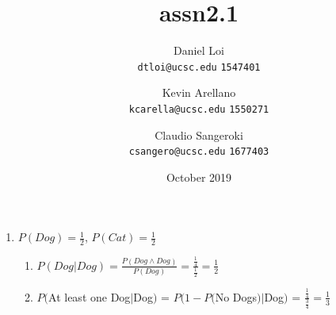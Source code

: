 \documentclass[12pt]{article}
\title{assn2.1}
\author{
  Daniel Loi\\
  \texttt{dtloi@ucsc.edu}
  \texttt{1547401}
  \and
  Kevin Arellano\\
  \texttt{kcarella@ucsc.edu}
  \texttt{1550271}
  \and
  Claudio Sangeroki\\
  \texttt{csangero@ucsc.edu}
  \texttt{1677403}
}
\date{October 2019}
\begin{document}
\maketitle

\begin{enumerate}
    \item 
        $P(Dog) = \frac{1}{2}$,
        $P(Cat) = \frac{1}{2}$
        \begin{enumerate}
        \item $P(Dog | Dog) = \frac{P(Dog \land Dog)}{P(Dog)} = \frac{\frac{1}{4}}{\frac{1}{2}} = \frac{1}{2}$  
        \item $P($At least one Dog$|$Dog$)$ = $P(1 - P($No Dogs$) | $Dog$)$ = $\frac{\frac{1}{4}}{\frac{3}{4}} = \frac{1}{3}$
        \end{enumerate}
    
    
\end{enumerate}
    
\end{document}
